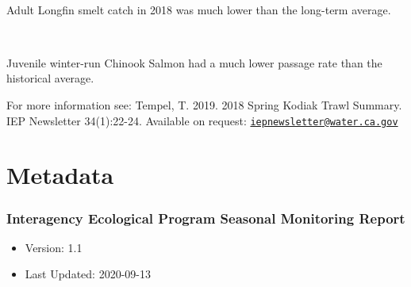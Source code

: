 \documentclass[
]{book}
\providecommand{\tightlist}{%
  \setlength{\itemsep}{0pt}\setlength{\parskip}{0pt}}
\begin{document}
\begin{panel-grid}
\begin{columns-nocenter}
\begin{column800}
\end{column800}

\begin{column40}

~

\end{column40}

\begin{column800}

Adult Longfin smelt catch in 2018 was much lower than the long-term average.

\end{column800}

\begin{column40}

~

\end{column40}

\begin{column800}

Juvenile winter-run Chinook Salmon had a much lower passage rate than the historical average.

\end{column800}

\end{columns-nocenter}

\end{panel-grid}

\begin{disclaimer}
For more information see: Tempel, T. 2019. 2018 Spring Kodiak Trawl
Summary. IEP Newsletter 34(1):22-24. Available on request:
\href{mailto:iepnewsletter@water.ca.gov}{\nolinkurl{iepnewsletter@water.ca.gov}}
\end{disclaimer}

\hypertarget{metadata}{%
\chapter{Metadata}\label{metadata}}

\hypertarget{interagency-ecological-program-seasonal-monitoring-report}{%
\subsection{Interagency Ecological Program Seasonal Monitoring Report}\label{interagency-ecological-program-seasonal-monitoring-report}}

\begin{itemize}
\tightlist
\item
  Version: 1.1
\item
  Last Updated: 2020-09-13
\end{itemize}
\end{document}
